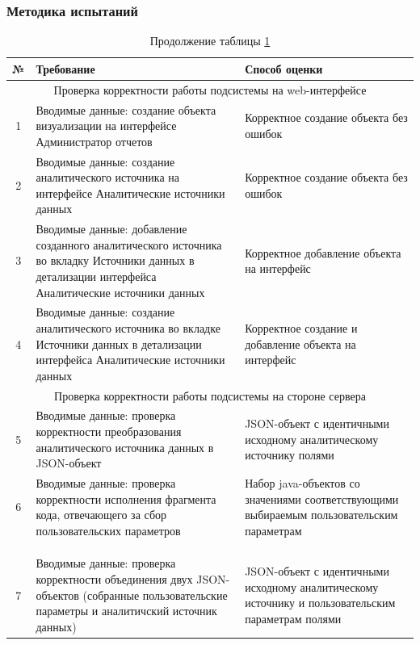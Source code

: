 \documentclass[a4paper]{extarticle}
\numberwithin{equation}{section}
\begin{document}
\newpage
\subsubsection{Методика испытаний}
\begin{longtable}[H]{|c|p{}|p{}|}
  \caption{Методика испытаний}
  \label{tableMetod} \\\hline
  №  & Требование & Способ оценки \\\hline
  \multicolumn{3}{|c|}{Проверка корректности работы подсистемы на web-интерфейсе} \\\hline
  1  & Вводимые данные: создание объекта визуализации на интерфейсе Администратор отчетов & Корректное создание объекта без ошибок \\\hline
  2  & Вводимые данные: создание аналитического источника на интерфейсе Аналитические источники данных & Корректное создание объекта без ошибок \\\hline
  3  & Вводимые данные: добавление созданного аналитического источника во вкладку Источники данных в детализации интерфейса Аналитические источники данных & Корректное добавление объекта на интерфейс \\\hline
  4  & Вводимые данные: создание аналитического источника во вкладке Источники данных в детализации интерфейса Аналитические источники данных & Корректное создание и добавление объекта на интерфейс \\\hline
  \multicolumn{3}{|c|}{Проверка корректности работы подсистемы на стороне сервера} \\\hline
  5  & Вводимые данные: проверка корректности преобразования аналитического источника данных в JSON-объект & JSON-объект с идентичными исходному аналитическому источнику полями \\\hline
  6  & Вводимые данные: проверка корректности исполнения фрагмента кода, отвечающего за сбор пользовательских параметров & Набор java-объектов со значениями соответствующими выбираемым пользовательским параметрам \\
  \multicolumn{3}{l}{}\\\multicolumn{3}{l}{}\\
  \caption*{Продолжение таблицы \ref{tableMetod}} \\\hline
  7  & Вводимые данные: проверка корректности объединения двух JSON-объектов (собранные пользовательские параметры и аналитичский источник данных) & JSON-объект с идентичными исходному аналитическому источнику и пользовательским параметрам полями \\\hline
\end{longtable}\par
\end{document}
